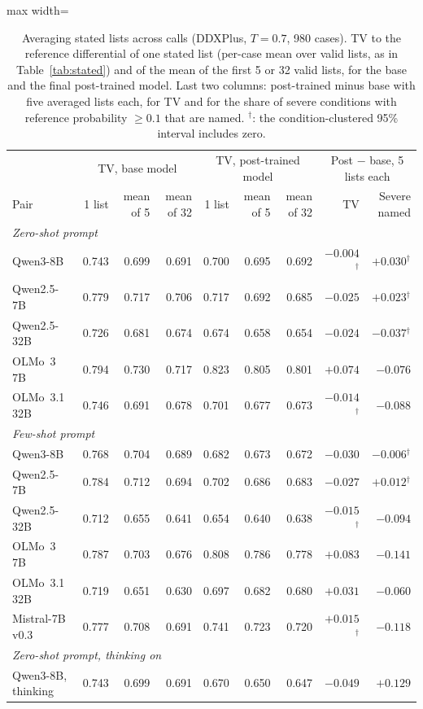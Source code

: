 \documentclass[11pt]{article}
\begin{document}
\begin{table}[t]
\centering
\begin{adjustbox}{max width=\textwidth}
\begin{tabular}{lrrrrrrrr}
\toprule
 & \multicolumn{3}{c}{TV, base model} & \multicolumn{3}{c}{TV, post-trained model} & \multicolumn{2}{c}{Post $-$ base, 5 lists each} \\
Pair & 1 list & mean of 5 & mean of 32 & 1 list & mean of 5 & mean of 32 & TV & Severe named \\
\midrule
\multicolumn{9}{l}{\emph{Zero-shot prompt}} \\
Qwen3-8B & 0.743 & 0.699 & 0.691 & 0.700 & 0.695 & 0.692 & $-0.004$$^{\dagger}$ & $+0.030$$^{\dagger}$ \\
Qwen2.5-7B & 0.779 & 0.717 & 0.706 & 0.717 & 0.692 & 0.685 & $-0.025$ & $+0.023$$^{\dagger}$ \\
Qwen2.5-32B & 0.726 & 0.681 & 0.674 & 0.674 & 0.658 & 0.654 & $-0.024$ & $-0.037$$^{\dagger}$ \\
OLMo~3 7B & 0.794 & 0.730 & 0.717 & 0.823 & 0.805 & 0.801 & $+0.074$ & $-0.076$ \\
OLMo~3.1 32B & 0.746 & 0.691 & 0.678 & 0.701 & 0.677 & 0.673 & $-0.014$$^{\dagger}$ & $-0.088$ \\
\midrule
\multicolumn{9}{l}{\emph{Few-shot prompt}} \\
Qwen3-8B & 0.768 & 0.704 & 0.689 & 0.682 & 0.673 & 0.672 & $-0.030$ & $-0.006$$^{\dagger}$ \\
Qwen2.5-7B & 0.784 & 0.712 & 0.694 & 0.702 & 0.686 & 0.683 & $-0.027$ & $+0.012$$^{\dagger}$ \\
Qwen2.5-32B & 0.712 & 0.655 & 0.641 & 0.654 & 0.640 & 0.638 & $-0.015$$^{\dagger}$ & $-0.094$ \\
OLMo~3 7B & 0.787 & 0.703 & 0.676 & 0.808 & 0.786 & 0.778 & $+0.083$ & $-0.141$ \\
OLMo~3.1 32B & 0.719 & 0.651 & 0.630 & 0.697 & 0.682 & 0.680 & $+0.031$ & $-0.060$ \\
Mistral-7B v0.3 & 0.777 & 0.708 & 0.691 & 0.741 & 0.723 & 0.720 & $+0.015$$^{\dagger}$ & $-0.118$ \\
\midrule
\multicolumn{9}{l}{\emph{Zero-shot prompt, thinking on}} \\
Qwen3-8B, thinking & 0.743 & 0.699 & 0.691 & 0.670 & 0.650 & 0.647 & $-0.049$ & $+0.129$ \\
\bottomrule
\end{tabular}
\end{adjustbox}
\caption{Averaging stated lists across calls (DDXPlus, $T{=}0.7$, 980 cases). TV to the reference differential of one stated list (per-case mean over valid lists, as in Table~\ref{tab:stated}) and of the mean of the first 5 or 32 valid lists, for the base and the final post-trained model. Last two columns: post-trained minus base with five averaged lists each, for TV and for the share of severe conditions with reference probability $\geq 0.1$ that are named. $^{\dagger}$: the condition-clustered 95\% interval includes zero.}
\label{tab:aggregate}
\end{table}
\end{document}
